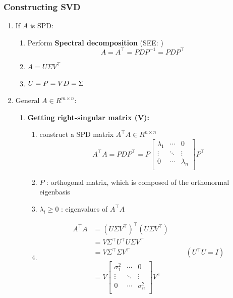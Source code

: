 \subsubsection{Constructing SVD}
\begin{enumerate}
    \item If $A$ is SPD:
    \begin{enumerate}
        \item Perform \textbf{Spectral decomposition} (SEE: )
        \[
            A = A^\top = PDP^{-1} = PDP^\top
        \]


        \item $A = U\Sigma V^\top$

        \item $\hfill U = P = V \hfill D = \Sigma \hfill$
    \end{enumerate}

    \item General $A \in R^{m\times n}$:
    \begin{enumerate}
        \item \textbf{Getting right-singular matrix (V):}
        \begin{enumerate}
            \item construct a SPD matrix $A^\top A \in R^{n\times n}$
            \[
                A^\top A = PDP^\top = P \begin{bmatrix}
                    \lambda_1 & \cdots & 0 \\
                    \vdots & \ddots & \vdots \\
                    0 & \cdots & \lambda_n\\
                \end{bmatrix} P^\top
            \]

            \item $P$ : orthogonal matrix, which is composed of the orthonormal eigenbasis

            \item $\lambda_i \geq 0$ : eigenvalues of $A^\top A$

            \item \begin{align*}
                A^\top A 
                &= (U\Sigma V^\top )^\top (U\Sigma V^\top ) \\
                &= V\Sigma ^\top U^\top U\Sigma V^\top \\
                &= V\Sigma ^\top \Sigma V^\top  &&& (U^\top U = I)\\
                &= V \begin{bmatrix}
                    \sigma_1^2 & \cdots & 0 \\
                    \vdots & \ddots & \vdots \\
                    0 & \cdots & \sigma_n^2\\
                \end{bmatrix} V^\top
            \end{align*}


\end{enumerate}
\end{enumerate}
\end{enumerate}
